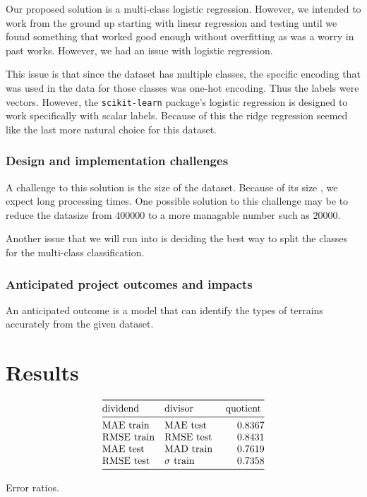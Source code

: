 \documentclass[11pt]{report}
\begin{document}
Our proposed solution is a multi-class logistic regression.
However, we intended to work from the ground up
starting with linear regression
and testing until we found something that worked good enough
without overfitting
as was a worry in past works.
However, we had an issue with logistic regression.

This issue is that since the dataset has multiple classes,
the specific encoding that was used in the data for those classes was one-hot encoding.
Thus the labels were vectors.
However, the \texttt{scikit-learn} package's logistic regression is designed to work specifically with scalar labels.
Because of this the ridge regression seemed like the last more natural choice for this dataset.

\subsubsection{Design and implementation challenges}

A challenge to this solution is the size of the dataset.
Because of its size , we expect long processing times.
One possible solution to this challenge may be to reduce the datasize
from \(\num{400000}\) to a more managable number such as
\(\num{20000}\).

Another issue that we will run into is deciding the best way to split the classes for the multi-class classification.

\subsubsection{Anticipated project outcomes and impacts}

An anticipated outcome is a model that can identify the types of terrains accurately from the given dataset.

\section{Results}

\begin{table}[]
    \centering
    \[
        \begin{array}{@{}llS[round-mode=figures,round-precision=4]@{}}
        \toprule
            \text{dividend} & \text{divisor} & \text{quotient}
        \\*
        \midrule
            \text{MAE train} & \text{MAE test}
            & 0.836726
        \\*
            \text{RMSE train} & \text{RMSE test}
            & 0.843065
        \\*
            \text{MAE test} & \text{MAD train}
            & 0.761874
        \\*
            \text{RMSE test} & \text{\(\sigma\) train}
            & 0.735807
        \\*
        \bottomrule
        \end{array}
    \]
    \caption{Error ratios.}
    \label{tab:error ratios}
\end{table}
\end{document}

